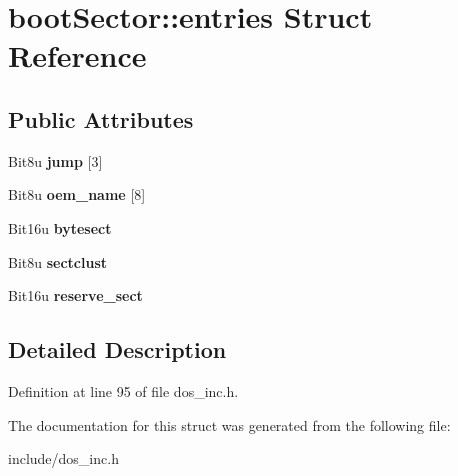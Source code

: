 \hypertarget{structbootSector_1_1entries}{\section{boot\-Sector\-:\-:entries Struct Reference}
\label{structbootSector_1_1entries}
}
\subsection*{Public Attributes}
\begin{DoxyCompactItemize}
\item 
\hypertarget{structbootSector_1_1entries_aede37d701d01c1d81d92bb687f947c3e}{Bit8u {\bfseries jump} \mbox{[}3\mbox{]}}\label{structbootSector_1_1entries_aede37d701d01c1d81d92bb687f947c3e}

\item 
\hypertarget{structbootSector_1_1entries_af9df20d54c938ddbc6fbbe7a191c31a0}{Bit8u {\bfseries oem\-\_\-name} \mbox{[}8\mbox{]}}\label{structbootSector_1_1entries_af9df20d54c938ddbc6fbbe7a191c31a0}

\item 
\hypertarget{structbootSector_1_1entries_ae511cf16c76c77a116b23ded1ce03bb2}{Bit16u {\bfseries bytesect}}\label{structbootSector_1_1entries_ae511cf16c76c77a116b23ded1ce03bb2}

\item 
\hypertarget{structbootSector_1_1entries_ad2141369a7ebe03d4d180cf7419a8318}{Bit8u {\bfseries sectclust}}\label{structbootSector_1_1entries_ad2141369a7ebe03d4d180cf7419a8318}

\item 
\hypertarget{structbootSector_1_1entries_adee951b436d21c211acf15c75e0b2126}{Bit16u {\bfseries reserve\-\_\-sect}}\label{structbootSector_1_1entries_adee951b436d21c211acf15c75e0b2126}

\end{DoxyCompactItemize}


\subsection{Detailed Description}


Definition at line 95 of file dos\-\_\-inc.\-h.



The documentation for this struct was generated from the following file\-:\begin{DoxyCompactItemize}
\item 
include/dos\-\_\-inc.\-h\end{DoxyCompactItemize}
